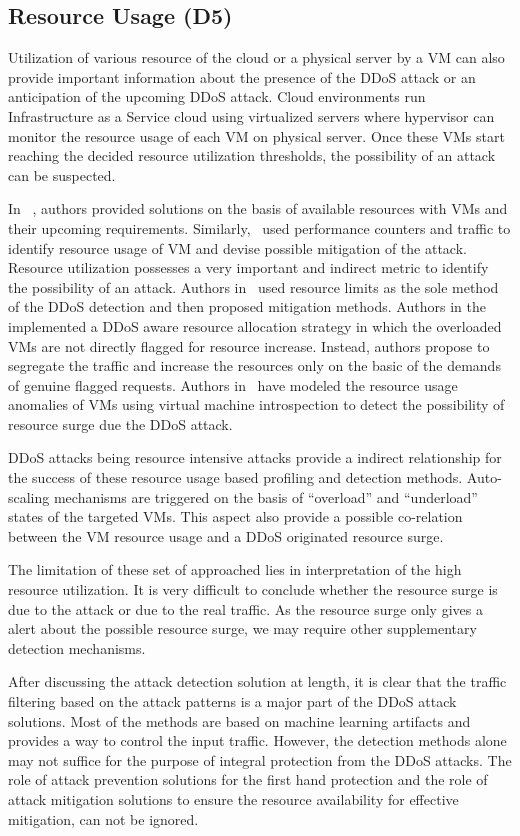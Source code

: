 \documentclass[final,5p,times,twocolumn]{elsarticle}
\begin{document}
\subsection{Resource Usage (D5)}
{Utilization of various resource of the cloud or a physical server by a VM can also provide important information about the presence of the DDoS attack or an anticipation of the upcoming DDoS attack. Cloud environments run Infrastructure as a Service cloud using virtualized servers where hypervisor can monitor the resource usage of each VM on physical server. Once these VMs start reaching the decided resource utilization thresholds, the possibility of an attack can be suspected. }

In ~\cite{defend}, authors provided solutions on the basis of available resources with VMs and their upcoming requirements. Similarly,~\cite{latanicki} used performance counters and traffic to identify resource usage of VM and devise possible mitigation of the attack. Resource utilization possesses a very important and indirect metric to identify the possibility of an attack. Authors in~\cite{canwebeat} used resource limits as the sole method of the DDoS detection and then proposed mitigation methods.  {Authors in the~\cite{DARAC} implemented a DDoS aware resource allocation strategy in which the overloaded VMs are not directly flagged for resource increase. Instead, authors propose to segregate the traffic and increase the resources only on the basic of the demands of genuine flagged requests. Authors in~\cite{ATOM} have modeled the resource usage anomalies of VMs using virtual machine introspection to detect the possibility of resource surge due the DDoS attack. }

{DDoS attacks being resource intensive attacks provide a indirect relationship for the success of these resource usage based profiling and detection methods. Auto-scaling mechanisms are triggered on the basis of ``overload'' and ``underload'' states of the targeted VMs. This aspect also provide a possible co-relation between the VM resource usage and a DDoS originated resource surge. }

{The limitation of these set of approached lies in interpretation of the high resource utilization. It is very difficult to conclude whether the resource surge is due to the attack or due to the real traffic. As the resource surge only gives a alert about the possible resource surge, we may require other supplementary detection mechanisms. }

{After discussing the attack detection solution at length, it is clear that the traffic filtering based on the attack patterns is a major part of the DDoS attack solutions. Most of the methods are based on machine learning artifacts and provides a way to control the input traffic. However, the detection methods alone may not suffice for the purpose of integral protection from the DDoS attacks. The role of attack prevention solutions for the first hand protection and the role of attack mitigation solutions to ensure the resource availability for effective mitigation, can not be ignored. }
\end{document}
